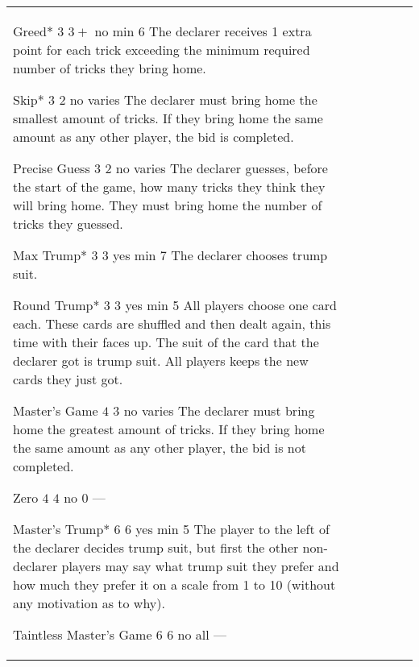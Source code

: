 \begin{table}
\begin{center}
\begin{tabularx}{\textwidth}{lcccc|X}
				\standardBidItem%
				{Greed*}
				{$3$}
				{$3+$}
				{no}
				{min 6}
				{%
					The declarer receives 1 extra point for each trick exceeding the minimum required number of tricks they bring home.
				}

				\standardBidItem%
				{Skip*}
				{$3$}
				{$2$}
				{no}
				{varies}
				{%
					The declarer must bring home the smallest amount of tricks. If they bring home the same amount as any other player, the bid is completed.
				}

				\standardBidItem%
				{Precise Guess}
				{$3$}
				{$2$}
				{no}
				{varies}
				{%
					The declarer guesses, before the start of the game, how many tricks they think they will bring home. They must bring home the number of tricks they guessed.
				}

				\standardBidItem%
				{Max Trump*}
				{$3$}
				{$3$}
				{yes}
				{min 7}
				{%
					The declarer chooses trump suit.
				}

				\standardBidItem%
				{Round Trump*}
				{$3$}
				{$3$}
				{yes}
				{min 5}
				{%
					All players choose one card each. These cards are shuffled and then dealt again, this time with their faces up. The suit of the card that the declarer got is trump suit. All players keeps the new cards they just got.
				}

				\standardBidItem%
				{Master's Game}
				{$4$}
				{$3$}
				{no}
				{varies}
				{%
					The declarer must bring home the greatest amount of tricks. If they bring home the same amount as any other player, the bid is not completed. 
				}

				\standardBidItem%
				{Zero}
				{$4$}
				{$4$}
				{no}
				{0}
				{%
					---
				}

				\standardBidItem%
				{Master's Trump*}
				{$6$}
				{$6$}
				{yes}
				{min 5}
				{%
					The player to the left of the declarer decides trump suit, but first the other non-declarer players may say what trump suit they prefer and how much they prefer it on a scale from 1 to 10 (without any motivation as to why).
				}

				\standardBidItem%
				{Taintless Master's Game}
				{$6$}
				{$6$}
				{no}
				{all}
				{%
					---
				}
		\end{tabularx}
	\end{center}
\end{table}
